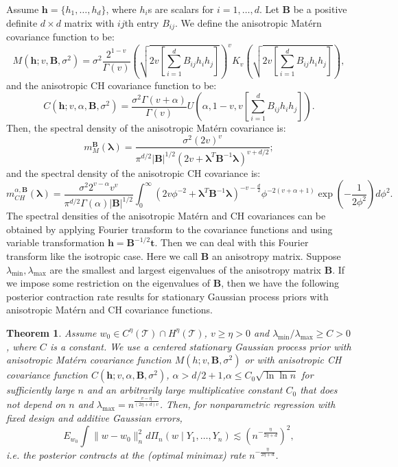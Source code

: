 \documentclass[ejs,noshowframe]{imsart}
\theoremstyle{plain}
\newtheorem{theorem}{Theorem}[section]
\theoremstyle{definition}
\theoremstyle{remark}
\begin{document}
Assume   $\bm{h}=\{h_1, \ldots,h_d\}$, where $h_i$s are scalars for $i=1,\ldots,d$. Let $\bm{B}$ be a positive definite $d \times d$ matrix with $ij$th entry  ${B}_{ij}$. We  define the anisotropic Mat\'ern covariance function  to be: 
$$
M(\bm{h};v,\bm{B},\sigma^2)=\sigma^2 \frac{2^{1-v}}{\Gamma(v)}\left(\sqrt{2v\left[\sum_{i=1}^{d}{{B}_{ij}}{h_ih_j}\right]}\right)^v {K}_v\left( \sqrt{2v\left[\sum_{i=1}^{d}{{B}_{ij}}{h_ih_j}\right]} \right),
$$
and the anisotropic CH covariance function to be:
$$
C(\bm{h};v,\alpha,\bm{B},\sigma^2)=\frac{\sigma^2 \Gamma(v+\alpha)}{\Gamma(v)}U\left(\alpha,1-v,v\left[\sum_{i=1}^{d}{{B}_{ij}}{h_ih_j}\right]\right).
$$
Then, the spectral density of the  anisotropic Mat\'ern covariance is: 
$$
m_M^{\bm{B}}(\bm{\lambda}) = \frac{\sigma^2(2 v)^{v}}{\pi^{d / 2}|\bm{B}|^{1/2}\left(2v+\bm{\lambda}^T\bm{B}^{-1}\bm{\lambda}  \right)^{v+d/2}} ;
$$
and the spectral density of the anisotropic CH covariance is: 
\begin{displaymath}
m^{\alpha,\bm{B}}_{CH}(\bm{\lambda}) =  \frac{\sigma^2 2^{v-\alpha} v^v }{\pi^{d/2}\Gamma(\alpha)|\bm{B}|^{1/2}}\int_0^{\infty} (2v\phi^{-2}+\bm{\lambda}^T\bm{B}^{-1}\bm{\lambda})^{-v-\frac{d}{2}}  \phi^{-2(v+\alpha+1)} \exp{(-\frac{1}{2\phi^2})d\phi^2}.
\end{displaymath}
The spectral densities of the anisotropic Mat\'ern  and CH covariances can be obtained by applying Fourier transform to the covariance functions and  using variable transformation $\bm{h}=\bm{B}^{-1/2}\bm{t}$. Then we can deal with this Fourier transform like the isotropic case.  Here we call $\bm{B}$ an anisotropy matrix. Suppose $\lambda_{\min}, \lambda_{\max}$ are the smallest and largest  eigenvalues of the anisotropy matrix $\bm{B}$. If we impose some restriction on the eigenvalues of $\bm{B}$, then we have the following posterior contraction rate results for stationary Gaussian process priors with anisotropic Mat\'ern and CH covariance functions.
\begin{theorem}\label{rescale anisotropic theorem}
Assume $w_0 \in C^{\eta}(\mathcal{T}) \cap H^{\eta}(\mathcal{T})$, $v \ge \eta>0$ and $\lambda_{\min}/\lambda_{\max} \ge C >0$, where $C$ is a constant.  We use a centered  stationary Gaussian process prior with  anisotropic Mat\'ern covariance function $M(h;v,\bm{B},\sigma^2)$ or with  anisotropic CH covariance function  $C(\bm{h};v,\alpha,\bm{B},\sigma^2)$,  $\alpha>d/2+1$,$\alpha \leq C_0 \sqrt{\ln \ln{n}}$  for sufficiently large $n$ and an arbitrarily large multiplicative constant $C_0$ that  does not depend on $n$ and $\lambda_{\max}=n^{\frac{v-\eta}{(2\eta+d)v}}$. Then,  for nonparametric regression with fixed design and additive Gaussian errors, 
$$
E_{w_0} \int \|w-w_0\|_n^2 d \Pi_n(w\mid Y_1,\ldots,Y_n) \lesssim (n^{-\frac{\eta}{2\eta+d}})^2,
$$
i.e. the posterior contracts at the (optimal minimax) rate $n^{-\frac{\eta}{2\eta+d}}$. 

\end{theorem}
\end{document}
